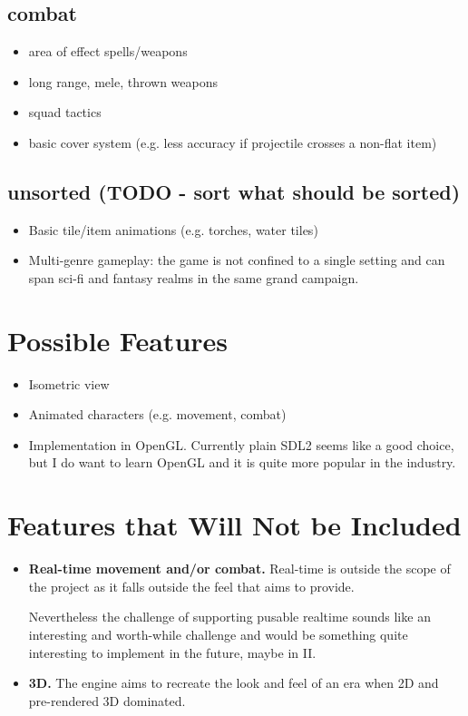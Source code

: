 \documentclass[a4paper,10pt]{book}
\begin{document}
\subsection{combat}
\begin{itemize}
  \item area of effect spells/weapons
  \item long range, mele, thrown weapons
  \item squad tactics
  \item basic cover system (e.g. less accuracy if projectile crosses a non-flat item)
\end{itemize}

\subsection{unsorted (TODO - sort what should be sorted)}
\begin{itemize}
  \item Basic tile/item animations (e.g. torches, water tiles)
  \item Multi-genre gameplay: the game is not confined to a single setting and can span sci-fi and fantasy realms in the same grand campaign.
\end{itemize}

\section{Possible Features}
\begin{itemize}
  \item Isometric view
  \item Animated characters (e.g. movement, combat)
  \item Implementation in OpenGL. Currently plain SDL2 seems like a good choice, but I do want to learn OpenGL and it is quite more popular in the industry.
\end{itemize}

\section{Features that Will Not be Included}
\begin{itemize}
  \item \textbf{Real-time movement and/or combat.} Real-time is outside the scope of the project as it falls outside the feel that \Gamename{} aims to provide.
 
  Nevertheless the challenge of supporting pusable realtime sounds like an interesting and worth-while challenge and would be something quite interesting to implement in the future, maybe in \Enginename{} II.
 
  \item \textbf{3D.} The engine aims to recreate the look and feel of an era when 2D and pre-rendered 3D dominated.
\end{itemize}
\end{document}
